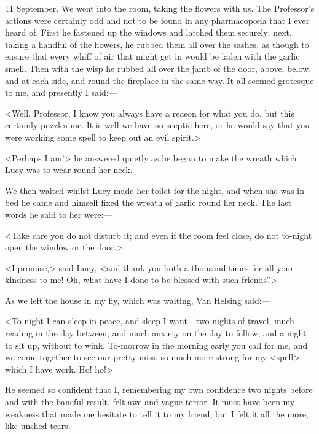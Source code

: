 \begin{diary}{11 September.}
We went into the room, taking the flowers with us. The Professor's actions were certainly odd and not to be found in any pharmacopœia that I ever heard of. First he fastened up the windows and latched them securely; next, taking a handful of the flowers, he rubbed them all over the sashes, as though to ensure that every whiff of air that might get in would be laden with the garlic smell. Then with the wisp he rubbed all over the jamb of the door, above, below, and at each side, and round the fireplace in the same way. It all seemed grotesque to me, and presently I said:—

<Well, Professor, I know you always have a reason for what you do, but this certainly puzzles me. It is well we have no sceptic here, or he would say that you were working some spell to keep out an evil spirit.>

<Perhaps I am!> he answered quietly as he began to make the wreath which Lucy was to wear round her neck.

We then waited whilst Lucy made her toilet for the night, and when she was in bed he came and himself fixed the wreath of garlic round her neck. The last words he said to her were:—

<Take care you do not disturb it; and even if the room feel close, do not to-night open the window or the door.>

<I promise,> said Lucy, <and thank you both a thousand times for all your kindness to me! Oh, what have I done to be blessed with such friends?>

As we left the house in my fly, which was waiting, Van Helsing said:—

<To-night I can sleep in peace, and sleep I want—two nights of travel, much reading in the day between, and much anxiety on the day to follow, and a night to sit up, without to wink. To-morrow in the morning early you call for me, and we come together to see our pretty miss, so much more strong for my <spell> which I have work. Ho! ho!>

He seemed so confident that I, remembering my own confidence two nights before and with the baneful result, felt awe and vague terror. It must have been my weakness that made me hesitate to tell it to my friend, but I felt it all the more, like unshed tears.
\end{diary}
